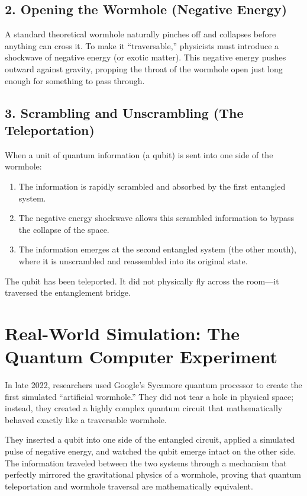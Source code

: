 \documentclass[12pt]{article}
\begin{document}
\subsection*{2. Opening the Wormhole (Negative Energy)}
A standard theoretical wormhole naturally pinches off and collapses before anything can cross it. To make it ``traversable,'' physicists must introduce a shockwave of negative energy (or exotic matter). This negative energy pushes outward against gravity, propping the throat of the wormhole open just long enough for something to pass through.

\subsection*{3. Scrambling and Unscrambling (The Teleportation)}
When a unit of quantum information (a qubit) is sent into one side of the wormhole:
\begin{enumerate}
    \item The information is rapidly scrambled and absorbed by the first entangled system.
    \item The negative energy shockwave allows this scrambled information to bypass the collapse of the space.
    \item The information emerges at the second entangled system (the other mouth), where it is unscrambled and reassembled into its original state.
\end{enumerate}

The qubit has been teleported. It did not physically fly across the room---it traversed the entanglement bridge.

\section*{Real-World Simulation: The Quantum Computer Experiment}
In late 2022, researchers used Google's Sycamore quantum processor to create the first simulated ``artificial wormhole.'' They did not tear a hole in physical space; instead, they created a highly complex quantum circuit that mathematically behaved exactly like a traversable wormhole. 

They inserted a qubit into one side of the entangled circuit, applied a simulated pulse of negative energy, and watched the qubit emerge intact on the other side. The information traveled between the two systems through a mechanism that perfectly mirrored the gravitational physics of a wormhole, proving that quantum teleportation and wormhole traversal are mathematically equivalent.
\end{document}
